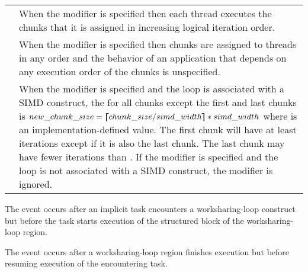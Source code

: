 \tablefirsthead{%
\hline\\[-3ex]
}
\tablelasttail{\hline}
\begin{supertabular}{ p{1in} p{4.1in} }
{} & When the {} modifier is specified then 
                      each thread executes the chunks that it is assigned in 
                      increasing logical iteration order.\\
{} & When the {} modifier is specified 
                         then chunks are assigned to threads in any order and 
                         the behavior of an application that depends on any 
                         execution order of the chunks is unspecified.\\
{} & When the {} modifier is specified and the loop 
                 is associated with a SIMD construct, the {} 
                 for all chunks except the first and last chunks  is  
                 $new\_chunk\_size = \bm{\lceil\mkern-10mu\lceil} chunk\_size / simd\_width \bm{\rceil\mkern-10mu\rceil} * simd\_width $ 
                 where {} is an implementation-defined value. 
                 The first chunk will have at least {} 
                 iterations except if it is also the last chunk. The last 
                 chunk may have fewer iterations than {}. 
                 If the {} modifier is specified and the loop is 
                 not associated  with a SIMD construct, the modifier is ignored.\\
\end{supertabular}
\linenumbers
\medskip

\events
The  event occurs after an implicit task encounters a
worksharing-loop construct but before the task starts execution of the structured
block of the worksharing-loop region.

The  event occurs after a worksharing-loop region finishes
execution but before resuming execution of the encountering task.

